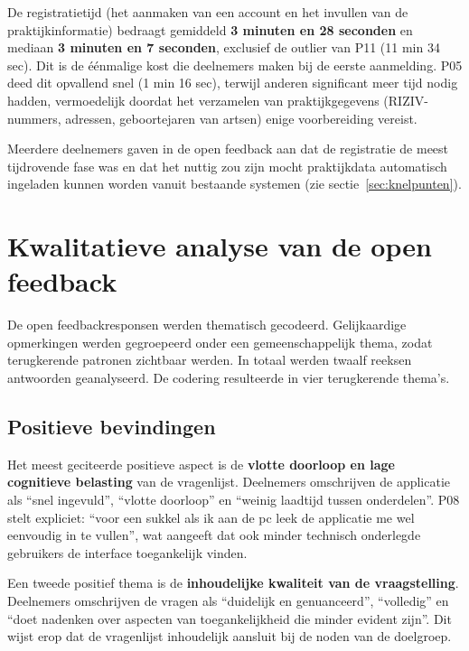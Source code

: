De registratietijd (het aanmaken van een account en het invullen van de praktijkinformatie) bedraagt gemiddeld \textbf{3 minuten en 28 seconden} en mediaan \textbf{3 minuten en 7 seconden}, exclusief de outlier van P11 (11 min 34 sec).
Dit is de éénmalige kost die deelnemers maken bij de eerste aanmelding.
P05 deed dit opvallend snel (1 min 16 sec), terwijl anderen significant meer tijd nodig hadden, vermoedelijk doordat het verzamelen van praktijkgegevens (RIZIV-nummers, adressen, geboortejaren van artsen) enige voorbereiding vereist.
\medskip

Meerdere deelnemers gaven in de open feedback aan dat de registratie de meest tijdrovende fase was en dat het nuttig zou zijn mocht praktijkdata automatisch ingeladen kunnen worden vanuit bestaande systemen (zie sectie~\ref{sec:knelpunten}).

\section{Kwalitatieve analyse van de open feedback}
\label{sec:openfeedback}
 
De open feedbackresponsen werden thematisch gecodeerd.
Gelijkaardige opmerkingen werden gegroepeerd onder een gemeenschappelijk thema, zodat terugkerende patronen zichtbaar werden.
In totaal werden twaalf reeksen antwoorden geanalyseerd.
De codering resulteerde in vier terugkerende thema's.
 
\subsection{Positieve bevindingen}
\label{subsec:positief}
 
Het meest geciteerde positieve aspect is de \textbf{vlotte doorloop en lage cognitieve belasting} van de vragenlijst.
Deelnemers omschrijven de applicatie als ``snel ingevuld'', ``vlotte doorloop'' en ``weinig laadtijd tussen onderdelen''.
P08 stelt expliciet: ``voor een sukkel als ik aan de pc leek de applicatie me wel eenvoudig in te vullen'', wat aangeeft dat ook minder technisch onderlegde gebruikers de interface toegankelijk vinden.
\medskip

Een tweede positief thema is de \textbf{inhoudelijke kwaliteit van de vraagstelling}.
Deelnemers omschrijven de vragen als ``duidelijk en genuanceerd'', ``volledig'' en ``doet nadenken over aspecten van toegankelijkheid die minder evident zijn''.
Dit wijst erop dat de vragenlijst inhoudelijk aansluit bij de noden van de doelgroep.
 
